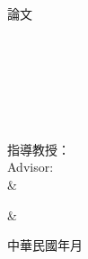 
\newcommand\itsempty{}
%
\begin{titlepage}

\begin{center}
%

\centering
\Large{\univCname}\\
\Large{\degreeCname 論文}\\
\vspace{0.3cm}
\Large{\univdepartmentEname }\\
\Large{\univEname }\\

\vspace{40pt}
\Large{\cTitle}\\  %
%
%
\Large{\eTitle}\\ %
\vspace{60pt}
\Large{\myCname}\\
\Large{\myEname}\\
\vspace{36pt}

\Large 指導教授：  \Large{\advisorCnameA} \\
\Large Advisor:  \Large{\advisorEnameA} \\[1em]
\ifx \advisorCnameB \itsempty \else
    & \makebox[4cm][l]{\Large{\advisorCnameB}} \\[1em]
\fi
    
\ifx \advisorCnameC \itsempty \else
    & \makebox[4cm][l]{\Large{\advisorCnameC}} \\[1em]
\fi

\vspace{27pt}
\Large{中華民國\cYear 年\cMonth 月}\\
\Large{ \eMonth  }\Large{\ } \Large{\eYear }
%
\end{center}
\renewcommand{\baselinestretch}{\mybaselinestretch}   %
\normalsize
\end{titlepage}

